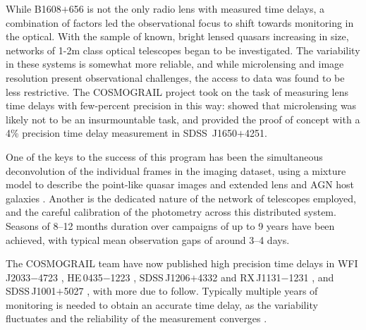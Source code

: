 While B1608$+$656 is not the only radio lens with measured time delays,
a combination of factors  led the observational focus to shift towards
monitoring in the optical. With the sample of known, bright lensed
quasars increasing in size,  networks of 1-2m class optical telescopes
began to be investigated. The variability in these systems is somewhat
more reliable, and while microlensing  and image resolution present
observational challenges, the access to data was found to be less
restrictive. The COSMOGRAIL project took on the task of measuring lens
time delays with few-percent precision in this way:  \citet{Eig++05}
showed that microlensing was likely not to be an insurmountable task,
and \citet{Vui++05} provided the proof of  concept with a 4\% precision
time delay measurement in SDSS\ J1650$+$4251.

One of the keys to the success of this program has been the simultaneous
deconvolution of the individual frames in the imaging dataset, using  a
mixture model to describe the point-like quasar images and extended lens
and AGN host galaxies \citep{MCS98}.  Another is the dedicated nature of
the network of telescopes employed, and the  careful calibration of the
photometry across this distributed system. Seasons of 8--12 months
duration over campaigns of up to 9 years have been achieved, with
typical mean observation gaps of around 3--4 days.

The COSMOGRAIL team have now published high precision time delays in
WFI\,J2033$-$4723 \citep[][3.8\%]{Vui++08}, HE\,0435$-$1223
\citep[][5.6\%]{Cou++11}, SDSS\,J1206$+$4332 \citep[][2.7\%]{Eul++13}
and  RX\,J1131$-$1231 \citep[][1.5\%]{Tew++13}, and SDSS\,J1001$+$5027
\citep[][2.8\%]{RK++13}, with more due to follow.  Typically multiple
years of monitoring is needed to obtain an accurate  time delay, as the
variability fluctuates and the reliability of the  measurement converges
\citep[see the discussion in e.g.\ ][]{Tew++13}.

